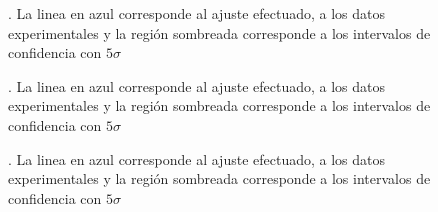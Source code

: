 \documentclass[%
 reprint,
 amsmath,amssymb,
 aps,
]{revtex4-1}
\begin{document}
\begin{figure}[h]
\caption{\label{Conductividad en función de la temperatura}.  La linea en azul corresponde al ajuste efectuado, a los datos experimentales y la región sombreada corresponde a los intervalos de confidencia con $5\sigma$}
\end{figure}


\begin{figure}[h]
\caption{\label{Region intrinseca}.  La linea en azul corresponde al ajuste efectuado, a los datos experimentales y la región sombreada corresponde a los intervalos de confidencia con $5\sigma$}
\end{figure}


\begin{figure}[h]
\caption{\label{movilidad de Hall}.  La linea en azul corresponde al ajuste efectuado, a los datos experimentales y la región sombreada corresponde a los intervalos de confidencia con $5\sigma$}
\end{figure}
\end{document}
